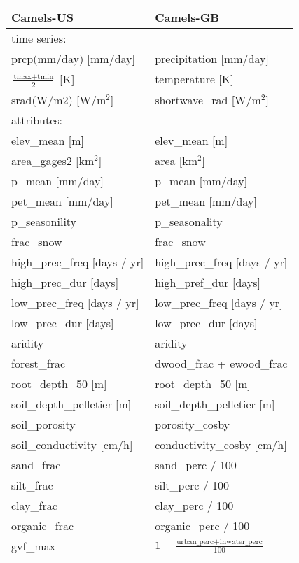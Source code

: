 \begin{tabular}{l|l}
\toprule
Camels-US &     Camels-GB \\
\midrule
time series: & \\
\midrule
prcp$($mm$/$day$)$ $[$mm$/$day$]$ & precipitation [mm/day] \\
    $\frac{\text{tmax} + \text{tmin}}{2}$ [K] & temperature [K]\\
    srad(W/m2) [W$/$m$^2$] & shortwave\_rad [W$/$m$^2$] \\
\midrule
    attributes: & \\
\midrule
elev\_mean [m]  & elev\_mean [m] \\
area\_gages2 [km$^2$] & area [km$^2$] \\
p\_mean [mm/day] & p\_mean [mm/day] \\
    pet\_mean [mm/day] & pet\_mean [mm/day] \\
p\_seasonility & p\_seasonality \\
frac\_snow & frac\_snow \\
    high\_prec\_freq [days / yr] & high\_prec\_freq [days / yr] \\
    high\_prec\_dur [days] & high\_pref\_dur [days]  \\
    low\_prec\_freq [days / yr] & low\_prec\_freq [days / yr] \\
    low\_prec\_dur [days] & low\_prec\_dur [days] \\
aridity & aridity \\
forest\_frac & dwood\_frac + ewood\_frac \\ 
root\_depth\_50 [m] & root\_depth\_50 [m] \\
soil\_depth\_pelletier [m] & soil\_depth\_pelletier [m] \\
soil\_porosity & porosity\_cosby \\
soil\_conductivity [cm/h] & conductivity\_cosby [cm/h] \\
sand\_frac & sand\_perc  / 100 \\
silt\_frac & silt\_perc / 100 \\ 
clay\_frac & clay\_perc  / 100 \\ 
organic\_frac & organic\_perc / 100 \\
    gvf\_max & $1 -\frac{\text{urban\_perc}+\text{inwater\_perc}}{100} $ \\
\bottomrule
\end{tabular}

